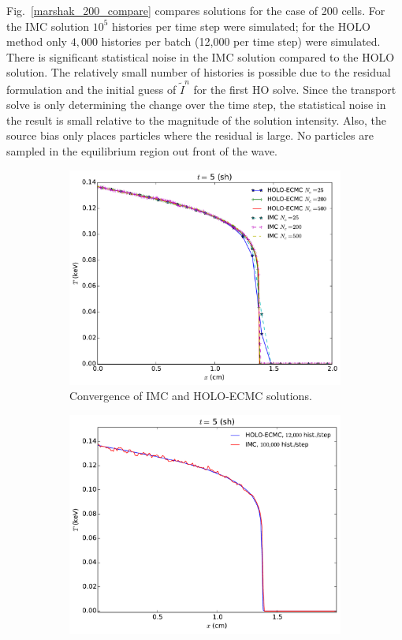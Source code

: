 \documentclass{mc2013}
\begin{document}
Fig.~\ref{marshak_200_compare} compares solutions
for the case of 200 cells.  For the IMC solution $10^5$ histories per time step were
simulated; for the HOLO method only $4,000$ histories per batch
(12,000 per time step) were simulated. There is significant statistical noise in the IMC solution
compared to the HOLO solution.  The relatively small number of histories is possible
due to the residual formulation and the initial guess of $\tilde{I}^{n}$ for the
first HO solve.  Since the transport solve is only determining the change over the
time step, the statistical noise in the result is small relative to the magnitude of
the solution intensity.  Also, the source bias only places particles where the residual is
large.  No particles are sampled in the equilibrium region out front of the wave. 
\begin{figure}
\begin{subfigure}{0.5\textwidth}
  \centering
    \includegraphics[width=0.99\linewidth]{marshak_mesh_conv.pdf}
    \caption{\label{marshak_mesh_conv} Convergence of IMC and HOLO-ECMC solutions.}
\end{subfigure}
\begin{subfigure}{0.5\textwidth}
  \centering
  \includegraphics[width=0.99\linewidth]{marshak_200_compare.pdf}

\end{subfigure}
\end{figure}
\end{document}
